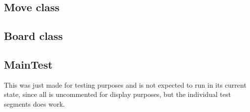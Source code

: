\documentclass[12pt, a4paper]{article}
\begin{document}
\subsection{Move class}

\newpage
\subsection{Board class}

\newpage
\subsection{MainTest}
This was just made for testing purposes and is not expected to run in its current state, since all is uncommented for display purposes, but the individual test segments does work.

\end{document}
